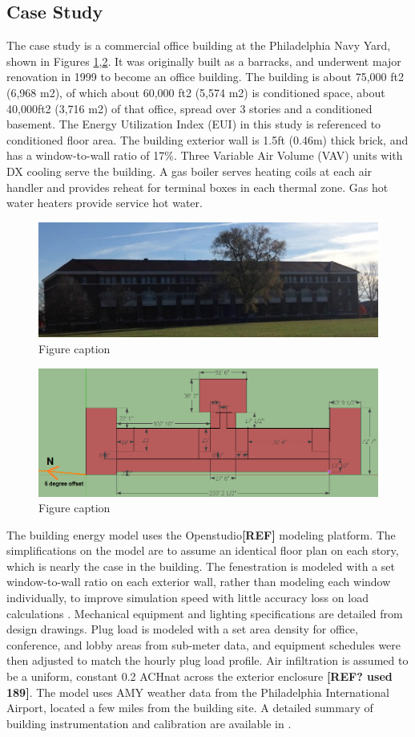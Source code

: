 \documentclass[review]{elsarticle}
\begin{document}
\subsection{Case Study}
The case study is a commercial office building at the Philadelphia Navy Yard, shown in Figures \ref{Bldg101a},\ref{Bldg101b}. It was originally built as a barracks, and underwent major renovation in 1999 to become an office building. The building is about 75,000 ft2 (6,968 m2), of which about 60,000 ft2 (5,574 m2) is conditioned space, about 40,000ft2 (3,716 m2) of that office, spread over 3 stories and a conditioned basement. The Energy Utilization Index (EUI) in this study is referenced to conditioned floor area.  The building exterior wall is 1.5ft (0.46m) thick brick, and has a window-to-wall ratio of 17\%.  Three Variable Air Volume (VAV) units with DX cooling serve the building. A gas boiler serves heating coils at each air handler and provides reheat for terminal boxes in each thermal zone. Gas hot water heaters provide service hot water.\par
\begin{figure}[h]
	\centering\includegraphics[width=0.4\linewidth]{Bldg101photo.jpg}
	\caption{Figure caption}
	\label{Bldg101a}
\end{figure}
\begin{figure}[h]
	\centering\includegraphics[width=0.4\linewidth]{Bldg101layout.png}
	\caption{Figure caption}
	\label{Bldg101b}
\end{figure}
The building energy model uses the Openstudio\textbf{[REF]} modeling platform.  The simplifications on the model are to assume an identical floor plan on each story, which is nearly the case in the building.  The fenestration is modeled with a set window-to-wall ratio on each exterior wall, rather than modeling each window individually, to improve simulation speed with little accuracy loss on load calculations \cite{Liu2011409}.  Mechanical equipment and lighting specifications are detailed from design drawings.  Plug load is modeled with a set area density for office, conference, and lobby areas from sub-meter data, and equipment schedules were then adjusted to match the hourly plug load profile\cite{Delgoshaei2013, Xu2012}.  Air infiltration is assumed to be a uniform, constant 0.2 ACHnat across the exterior enclosure \textbf{[REF? used 189]}. The model uses AMY weather data from the Philadelphia International Airport, located a few miles from the building site. A detailed summary of building instrumentation and calibration are available in \cite{Dasgupta2012, Dahlhausen2014}.    
\end{document}
